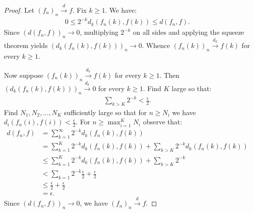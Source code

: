 \documentclass[11pt,twoside,openany]{memoir}
\begin{document}
        \begin{proof}
            Let $(f_n)_n \xrightarrow{d} f$. Fix $k\geq 1$. We have:
                \begin{equation*}
                \begin{split}
                    0 \leq 2^{-k}d_k(f_n(k),f(k)) \leq d(f_n,f).
                \end{split}
                \end{equation*}
            Since $(d(f_n,f))_n \rightarrow 0$, multiplying $2^{-k}$ on all sides and applying the squeeze theorem yields $(d_k(f_n(k),f(k)))_n \rightarrow 0$. Whence $(f_n(k))_n \xrightarrow{d_k} f(k)$ for every $k \geq 1$.

            Now suppose $(f_n(k))_n \xrightarrow{d_k}f(k)$ for every $k \geq 1$. Then $(d_k(f_n(k),f(k)))_n \xrightarrow{d_k} 0$ for every $k \geq 1$. Find $K$ large so that:
                \begin{equation*}
                \begin{split}
                    \sum_{k > K}2^{-k} < \frac{\epsilon}{2}.
                \end{split}
                \end{equation*}
            Find $N_1,N_2,...,N_K$ sufficiently large so that for $n \geq N_i$ we have $d_i(f_n(i),f(i)) < \frac{\epsilon}{2}$. For $n \geq \max_{i = 1}^K N_i$ observe that:
                \begin{equation*}
                \begin{split}
                    d(f_n,f)
                    & = \sum_{k = 1}^\infty 2^{-k}d_k(f_n(k),f(k)) \\
                    & = \sum_{k = 1}^K 2^{-k}d_k(f_n(k),f(k)) + \sum_{k > K} 2^{-k}d_k(f_n(k),f(k)) \\
                    & \leq \sum_{k = 1}^K 2^{-k}d_k(f_n(k),f(k)) + \sum_{k > K} 2^{-k} \\
                    & < \sum_{k = 1}2^{-k}\frac{\epsilon}{2} + \frac{\epsilon}{2} \\
                    & \leq \frac{\epsilon}{2} + \frac{\epsilon}{2} \\
                    & = \epsilon.
                \end{split}
                \end{equation*}
            Since $(d(f_n,f))_n \rightarrow 0$, we have $(f_n)_n \xrightarrow{d} f$.
        \end{proof}
\end{document}
